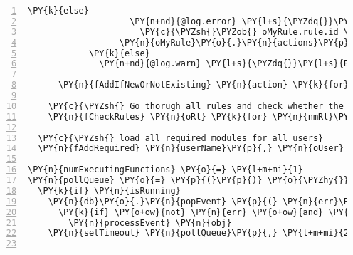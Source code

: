 \begin{Verbatim}[fontsize=\scriptsize,commandchars=\\\{\},numbers=left,firstnumber=1,stepnumber=1]
                  \PY{k}{else}
                    \PY{n+nd}{@log.error} \PY{l+s}{\PYZdq{}}\PY{l+s}{EN | Compilation of code failed! \PYZsh{}\PYZob{} userName \PYZcb{},}
                      \PY{c}{\PYZsh{}\PYZob{} oMyRule.rule.id \PYZcb{}, \PYZsh{}\PYZob{} moduleName \PYZcb{}: \PYZsh{}\PYZob{} result.answ.message \PYZcb{}\PYZdq{}}
                  \PY{n}{oMyRule}\PY{o}{.}\PY{n}{actions}\PY{p}{[}\PY{n}{moduleName}\PY{p}{]} \PY{o}{=} \PY{n}{result}
            \PY{k}{else}
              \PY{n+nd}{@log.warn} \PY{l+s}{\PYZdq{}}\PY{l+s}{EN | \PYZsh{}\PYZob{} moduleName \PYZcb{} not found for \PYZsh{}\PYZob{} oMyRule.rule.id \PYZcb{}!}\PY{l+s}{\PYZdq{}}

      \PY{n}{fAddIfNewOrNotExisting} \PY{n}{action} \PY{k}{for} \PY{n}{action} \PY{o+ow}{in} \PY{n}{oMyRule}\PY{o}{.}\PY{n}{rule}\PY{o}{.}\PY{n}{actions}

    \PY{c}{\PYZsh{} Go thorugh all rules and check whether the action is still required}
    \PY{n}{fCheckRules} \PY{n}{oRl} \PY{k}{for} \PY{n}{nmRl}\PY{p}{,} \PY{n}{oRl} \PY{n}{of} \PY{n}{oUser}

  \PY{c}{\PYZsh{} load all required modules for all users}
  \PY{n}{fAddRequired} \PY{n}{userName}\PY{p}{,} \PY{n}{oUser} \PY{k}{for} \PY{n}{userName}\PY{p}{,} \PY{n}{oUser} \PY{n}{of} \PY{n}{listUserRules}

\PY{n}{numExecutingFunctions} \PY{o}{=} \PY{l+m+mi}{1}
\PY{n}{pollQueue} \PY{o}{=} \PY{p}{(}\PY{p}{)} \PY{o}{\PYZhy{}}\PY{o}{\PYZgt{}}
  \PY{k}{if} \PY{n}{isRunning}
    \PY{n}{db}\PY{o}{.}\PY{n}{popEvent} \PY{p}{(} \PY{n}{err}\PY{p}{,} \PY{n}{obj} \PY{p}{)} \PY{o}{\PYZhy{}}\PY{o}{\PYZgt{}}
      \PY{k}{if} \PY{o+ow}{not} \PY{n}{err} \PY{o+ow}{and} \PY{n}{obj}
        \PY{n}{processEvent} \PY{n}{obj}
    \PY{n}{setTimeout} \PY{n}{pollQueue}\PY{p}{,} \PY{l+m+mi}{20} \PY{o}{*} \PY{n}{numExecutingFunctions} 


\end{Verbatim}
